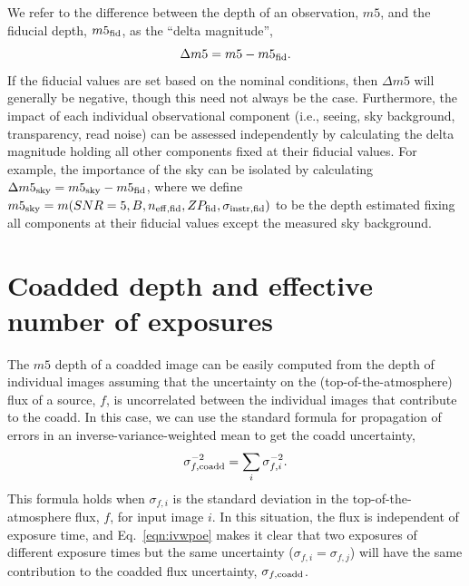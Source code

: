 \documentclass[DM,authoryear,toc]{lsstdoc}
\begin{document}
We refer to the difference between the depth of an observation, $m5$, and the fiducial depth, $m5_{\rm fid}$, as the ``delta magnitude'', 
\begin{equation}
    \Delta m5 =  m5 - m5_{\rm fid}.
\end{equation}
If the fiducial values are set based on the nominal conditions, then $\Delta m5$ will generally be negative, though this need not always be the case. Furthermore, the impact  of each individual observational component (i.e., seeing, sky background, transparency, read noise) can be assessed independently by calculating the delta magnitude holding all other components fixed at their fiducial values. For example, the importance of the sky can be isolated by calculating
$\Delta m5_{\rm sky} = m5_{\rm sky} - m5_{\rm fid}$,
where we define $m5_{\rm sky} = m(SNR=5, B, n_{\rm eff,fid}, ZP_{\rm fid}, \sigma_{\rm instr,fid})$ to be the depth estimated fixing all components at their fiducial values except the measured sky background.


\section{Coadded depth and effective number of exposures}
\label{sec:coadd_depth}


The $m5$ depth of a coadded image can be easily computed from the depth of individual images assuming that the uncertainty on the (top-of-the-atmosphere) flux of a source, $f$, is uncorrelated between the individual images that contribute to the coadd. In this case, we can use the standard formula for propagation of errors in an inverse-variance-weighted mean to get the coadd uncertainty,
\begin{equation}
\label{eqn:ivwpoe}
\sigma_{f,\rm{coadd}}^{-2} = \sum_i \sigma_{f,i}^{-2}.
\end{equation}
This formula holds when $\sigma_{f,i}$ is the standard deviation in the top-of-the-atmosphere flux, $f$, for input image $i$.
In this situation, the flux is independent of exposure time, and Eq.~\ref{eqn:ivwpoe} makes it clear that two exposures of different exposure times but the same uncertainty ($\sigma_{f,i} = \sigma_{f,j}$) will have the same contribution to the coadded flux uncertainty, $\sigma_{f, {\rm coadd}}$.
\end{document}
